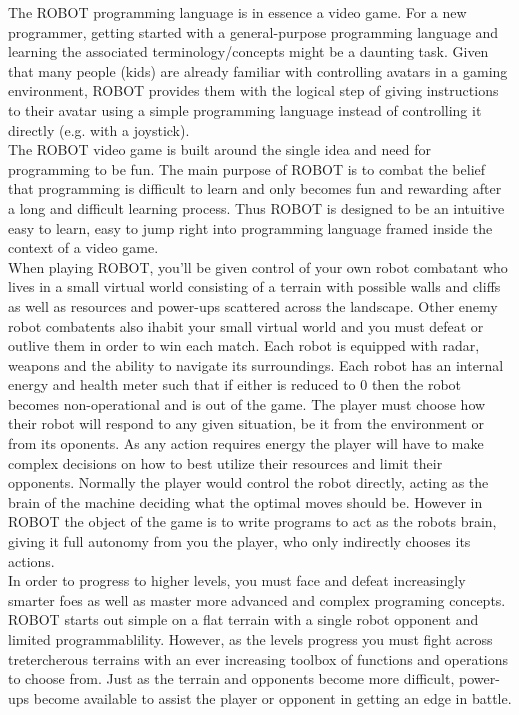 \documentclass[a4paper]{article}
\begin{document}
The ROBOT programming language is in essence a video game. For a new programmer, getting started with a general-purpose programming language and learning the associated terminology/concepts might be a daunting task.  Given that many people (kids) are already familiar with controlling avatars in a gaming environment, ROBOT provides them with the logical step of giving instructions to their avatar using a simple programming language instead of controlling it directly (e.g. with a joystick).\\

The ROBOT video game is built around the single idea and need for programming to be fun. The main purpose of ROBOT is to combat the belief that programming is difficult to learn and only becomes fun and rewarding after a long and difficult learning process. Thus ROBOT is designed to be an intuitive easy to learn, easy to jump right into programming language framed inside the context of a video game.\\

When playing ROBOT, you'll be given control of your own robot combatant who lives in a small virtual world consisting of a terrain with possible walls and cliffs as well as resources and power-ups scattered across the landscape. Other enemy robot combatents also ihabit your small virtual world and you must defeat or outlive them in order to win each match. Each robot is equipped with radar, weapons and the ability to navigate its surroundings. Each robot has an internal energy and health meter such that if either is reduced to 0 then the robot becomes non-operational and is out of the game. The player must choose how their robot will respond to any given situation, be it from the environment or from its oponents. As any action requires energy the player will have to make complex decisions on how to best utilize their resources and limit their opponents. Normally the player would control the robot directly, acting as the brain of the machine deciding what the optimal moves should be. However in ROBOT the object of the game is to write programs to act as the robots brain, giving it full autonomy from you the player, who only indirectly chooses its actions.\\

In order to progress to higher levels, you must face and defeat increasingly smarter foes as well as master more advanced and complex programing concepts. ROBOT starts out simple on a flat terrain with a single robot opponent and limited programmablility. However, as the levels progress you must fight across tretercherous terrains with an ever increasing toolbox of functions and operations to choose from. Just as the terrain and opponents become more difficult, power-ups become available to assist the player or opponent in getting an edge in battle.\\
\end{document}
